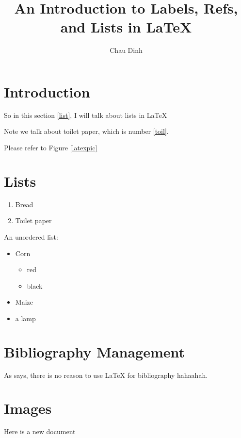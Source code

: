 \documentclass{article}
\author{Chau Dinh}
\title{An Introduction to Labels, Refs, and Lists in {\LaTeX} }
\begin{document}
\maketitle

\section{Introduction}

So in this section \ref{list}, I will talk about lists in {\LaTeX}

Note we talk about toilet paper, which is number \ref{toil}.

Please refer to Figure \ref{latexpic}

\section{Lists\label{list}}

\begin{enumerate}
\item Bread
\item Toilet paper\label{toil}
\end{enumerate}

An unordered list:

\begin{itemize}
\item Corn
    \begin{itemize}
    \item red
    \item black
    \end{itemize}
\item Maize
\item a lamp
\end{itemize}

\section{Bibliography Management}

As \textcite{test} says, there is no reason to use {\LaTeX} for bibliography hahaahah.

\printbibliography

\section{Images}

Here is a new document
\end{document}
